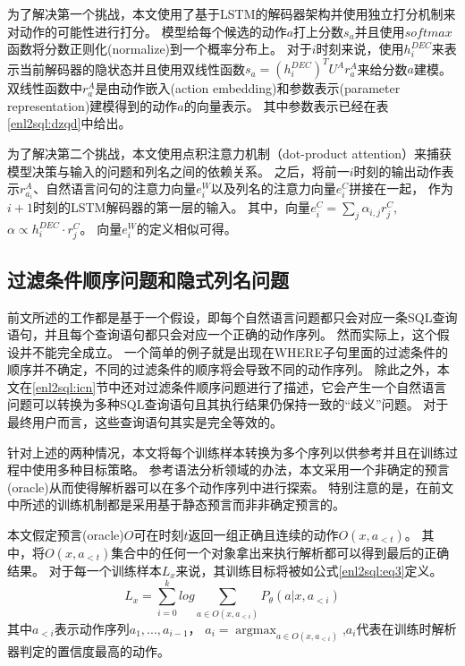 为了解决第一个挑战，本文使用了基于LSTM的解码器架构并使用独立打分机制来对动作的可能性进行打分。
模型给每个候选的动作$a$打上分数$s_a$并且使用$softmax$函数将分数正则化(normalize)到一个概率分布上。
对于$i$时刻来说，使用$h^{DEC}_i$来表示当前解码器的隐状态并且使用双线性函数$s_a = (h^{DEC}_i)^T U^A r^A_a$来给分数$a$建模。
双线性函数中$r^A_a$是由动作嵌入(action embedding)和参数表示(parameter representation)建模得到的动作$a$的向量表示。
其中参数表示已经在表\ref{enl2sql:dzqd}中给出。

为了解决第二个挑战，本文使用点积注意力机制（dot-product attention）\cite{vaswani2017attention}来捕获模型决策与输入的问题和列名之间的依赖关系。
之后，将前一$i$时刻的输出动作表示$r^A_{a_i}$、自然语言问句的注意力向量$e^W_i$以及列名的注意力向量$e^C_i$拼接在一起，
作为$i+1$时刻的LSTM解码器的第一层的输入。
其中，向量$e^C_i = \sum_j \alpha_{i,j} r^C_j$,  $\alpha \propto h^{DEC}_i \cdot r^C_j$。
向量$e^W_i$的定义相似可得。

\subsection{过滤条件顺序问题和隐式列名问题}
\label{enl2sql:ndo}

前文所述的工作都是基于一个假设，即每个自然语言问题都只会对应一条SQL查询语句，并且每个查询语句都只会对应一个正确的动作序列。
然而实际上，这个假设并不能完全成立。
一个简单的例子就是出现在WHERE子句里面的过滤条件的顺序并不确定，不同的过滤条件的顺序将会导致不同的动作序列。
除此之外，本文在\ref{enl2sql:icn}节中还对过滤条件顺序问题进行了描述，它会产生一个自然语言问题可以转换为多种SQL查询语句且其执行结果仍保持一致的“歧义”问题。
对于最终用户而言，这些查询语句其实是完全等效的。

针对上述的两种情况，本文将每个训练样本转换为多个序列以供参考并且在训练过程中使用多种目标策略。
参考语法分析领域的办法，本文采用一个非确定的预言(oracle)从而使得解析器可以在多个动作序列中进行探索。
特别注意的是，在前文中所述的训练机制都是采用基于静态预言而非非确定预言的。

本文假定预言(oracle)$O$可在时刻$t$返回一组正确且连续的动作$O(x,a_{<t})$。
其中，将$O(x,a_{<t})$集合中的任何一个对象拿出来执行解析都可以得到最后的正确结果。
对于每一个训练样本$L_x$来说，其训练目标将被如公式\ref{enl2sql:eq3}定义。
\begin{equation}
  \label{enl2sql:eq3}
  L_x = \sum_{i=0}^k log \sum_{a\in O(x,a_{<i})} P_{\theta}(a|x,a_{<i})
\end{equation}
其中$a_{<i}$表示动作序列$a_{1},...,a_{i-1}$，
$a_{i} = \mathop{\arg\max}_{a\in O(x,a_{<i})}$,$a_i$代表在训练时解析器判定的置信度最高的动作。

